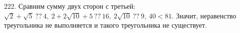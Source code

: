 222. Сравним сумму двух сторон с третьей: $\sqrt{2}+\sqrt{5}\ ??\ 4,\ 2+2\sqrt{10}+5\ ??\ 16,\ 2\sqrt{10}\ ??\ 9,\ 40<81.$ Значит, неравенство треугольника не выполняется и такого треугольника не существует.\\
